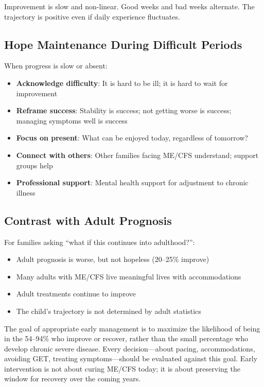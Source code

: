 Improvement is slow and non-linear. Good weeks and bad weeks alternate. The trajectory is positive even if daily experience fluctuates.

\subsection{Hope Maintenance During Difficult Periods}

When progress is slow or absent:

\begin{itemize}
    \item \textbf{Acknowledge difficulty}: It is hard to be ill; it is hard to wait for improvement
    \item \textbf{Reframe success}: Stability is success; not getting worse is success; managing symptoms well is success
    \item \textbf{Focus on present}: What can be enjoyed today, regardless of tomorrow?
    \item \textbf{Connect with others}: Other families facing ME/CFS understand; support groups help
    \item \textbf{Professional support}: Mental health support for adjustment to chronic illness
\end{itemize}

\subsection{Contrast with Adult Prognosis}

For families asking ``what if this continues into adulthood?'':

\begin{itemize}
    \item Adult prognosis is worse, but not hopeless (20--25\% improve)
    \item Many adults with ME/CFS live meaningful lives with accommodations
    \item Adult treatments continue to improve
    \item The child's trajectory is not determined by adult statistics
\end{itemize}

\begin{keypoint}
The goal of appropriate early management is to maximize the likelihood of being in the 54--94\% who improve or recover, rather than the small percentage who develop chronic severe disease. Every decision---about pacing, accommodations, avoiding GET, treating symptoms---should be evaluated against this goal. Early intervention is not about curing ME/CFS today; it is about preserving the window for recovery over the coming years.
\end{keypoint}

